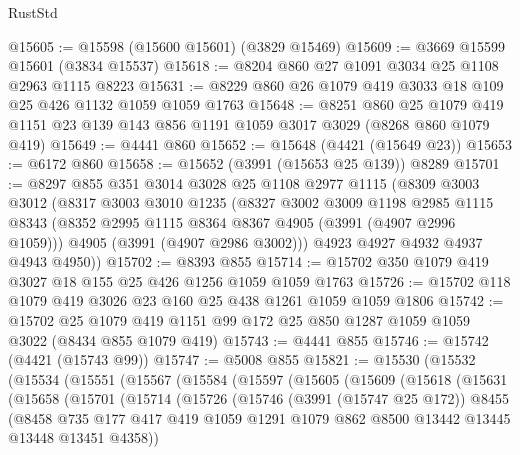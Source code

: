 \begin{lexlean}{RustStd}
\begin{coremodule}
@15605 := @15598 (@15600 @15601) (@3829 @15469)
@15609 := @3669 @15599 @15601 (@3834 @15537)
@15618 := @8204 @860 @27 @1091 @3034 @25 @1108 @2963 @1115 @8223
@15631 := @8229 @860 @26 @1079 @419 @3033 @18 @109 @25 @426 @1132 @1059 @1059 @1763
@15648 := @8251
    @860
    @25
    @1079
    @419
    @1151
    @23
    @139
    @143
    @856
    @1191
    @1059
    @3017
    @3029
    (@8268 @860 @1079 @419)
@15649 := @4441 @860
@15652 := @15648 (@4421 (@15649 @23))
@15653 := @6172 @860
@15658 := @15652 (@3991 (@15653 @25 @139)) @8289
@15701 := @8297
    @855
    @351
    @3014
    @3028
    @25
    @1108
    @2977
    @1115
    (@8309
      @3003
      @3012
      (@8317
        @3003
        @3010
        @1235
        (@8327
          @3002
          @3009
          @1198
          @2985
          @1115
          @8343
          (@8352 @2995 @1115 @8364 @8367 @4905 (@3991 (@4907 @2996 @1059)))
          @4905
          (@3991 (@4907 @2986 @3002)))
        @4923
        @4927
        @4932
        @4937
        @4943
        @4950))
@15702 := @8393 @855
@15714 := @15702 @350 @1079 @419 @3027 @18 @155 @25 @426 @1256 @1059 @1059 @1763
@15726 := @15702 @118 @1079 @419 @3026 @23 @160 @25 @438 @1261 @1059 @1059 @1806
@15742 := @15702
    @25
    @1079
    @419
    @1151
    @99
    @172
    @25
    @850
    @1287
    @1059
    @1059
    @3022
    (@8434 @855 @1079 @419)
@15743 := @4441 @855
@15746 := @15742 (@4421 (@15743 @99))
@15747 := @5008 @855
@15821 := @15530
    (@15532
      (@15534
        (@15551
          (@15567
            (@15584
              (@15597
                (@15605
                  (@15609
                    (@15618
                      (@15631
                        (@15658
                          (@15701
                            (@15714
                              (@15726
                                (@15746
                                  (@3991 (@15747 @25 @172))
                                  @8455
                                  (@8458
                                    @735
                                    @177
                                    @417
                                    @419
                                    @1059
                                    @1291
                                    @1079
                                    @862
                                    @8500
                                    @13442
                                    @13445
                                    @13448
                                    @13451
                                    @4358))

\end{coremodule}
\end{lexlean}
